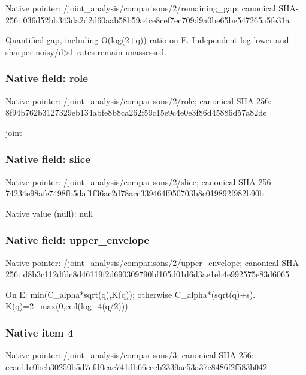 \documentclass[10pt,a4paper]{article}
\begin{document}
Native pointer: /joint\_analysis/comparis\allowbreak{}ons/2/remaining\_gap; canonical SHA-256: 036d52bb343da2d2d60aab58\allowbreak{}b59a4ce8cef7ec709d9a0be6\allowbreak{}5be547265a5fe31a


Quantified gap, including O(log(2+q)) ratio on E. Independent log lower and sharper noisy/d>1 rates remain unassessed.


\subsubsection{Native field: role}


Native pointer: /joint\_analysis/comparisons/2/role; canonical SHA-256: 8f94b762b3127329eb134abf\allowbreak{}e8b8ca262f59c15e9c4e0e3f\allowbreak{}86d45886d57a82de


joint


\subsubsection{Native field: slice}


Native pointer: /joint\_analysis/comparisons/2/slice; canonical SHA-256: 74234e98afe7498fb5daf1f3\allowbreak{}6ac2d78acc339464f950703b\allowbreak{}8c019892f982b90b



Native value (null): null



\subsubsection{Native field: upper\_envelope}


Native pointer: /joint\_analysis/comparis\allowbreak{}ons/2/upper\_envelope; canonical SHA-256: d8b3c112dfdc8d46119f2d69\allowbreak{}0309790bf105d01d6d3ae1eb\allowbreak{}4e992575e83d6065


On E: min(C\_alpha*sqrt(q),K(q)); otherwise C\_alpha*(sqrt(q)+s). K(q)=2+max(0,ceil(log\_4(q/2))).


\subsubsection{Native item 4}


Native pointer: /joint\_analysis/comparisons/3; canonical SHA-256: ccae11e0beb30250b5d7efd0\allowbreak{}eac741db66eeeb2339ac53a3\allowbreak{}7c8486f2f583b042
\end{document}
